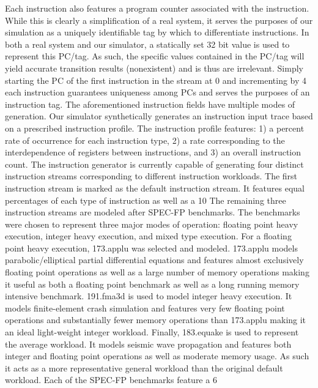 \documentclass{acm_proc_article-sp}
\begin{document}
	Each instruction also features a program counter associated with the instruction.  While this is clearly a simplification of a real system, it serves the purposes of our simulation as a uniquely identifiable tag by which to differentiate instructions.  In both a real system and our simulator, a statically set 32 bit value is used to represent this PC/tag.  As such, the specific values contained in the PC/tag will yield accurate transition results (nonexistent) and is thus are irrelevant.  Simply starting the PC of the first instruction in the stream at 0 and incrementing by 4 each instruction guarantees uniqueness among PCs and serves the purposes of an instruction tag.
	The aforementioned instruction fields have multiple modes of generation.  Our simulator synthetically generates an instruction input trace based on a prescribed instruction profile.  The instruction profile features: 1) a percent rate of occurrence for each instruction type, 2) a rate corresponding to the interdependence of registers between instructions, and 3) an overall instruction count.  
	The instruction generator is currently capable of generating four distinct instruction streams corresponding to different instruction workloads.  The first instruction stream is marked as the default instruction stream.  It features equal percentages of each type of instruction as well as a 10%
	The remaining three instruction streams are modeled after SPEC-FP benchmarks.  The benchmarks were chosen to represent three major modes of operation:  floating point heavy execution, integer heavy execution, and mixed type execution.  For a floating point heavy execution, 173.applu was selected and modeled.  173.applu models parabolic/elliptical partial differential equations and features almost exclusively floating point operations as well as a large number of memory operations making it useful as both a floating point benchmark as well as a long running memory intensive benchmark.  191.fma3d is used to model integer heavy execution.  It models finite-element crash simulation and features very few floating point operations and substantially fewer memory operations than 173.applu making it an ideal light-weight integer workload.  Finally, 183.equake is used to represent the average workload.  It models seismic wave propagation and features both integer and floating point operations as well as moderate memory usage.  As such it acts as a more representative general workload than the original default workload.  Each of the SPEC-FP benchmarks feature a 6%
\end{document}
